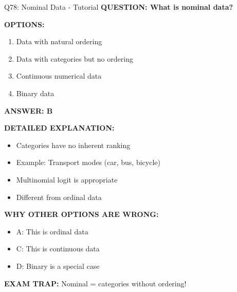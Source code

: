 \documentclass[8pt]{beamer}
\begin{document}
	\begin{frame}{Q78: Nominal Data - Tutorial}
		\fontsize{6.5}{7.5}\selectfont
		\textbf{QUESTION: What is nominal data?}
		
		\vspace{0.1cm}
		\textbf{OPTIONS:}
		\begin{enumerate}
			\item Data with natural ordering
			\item Data with categories but no ordering
			\item Continuous numerical data
			\item Binary data
		\end{enumerate}
		
		\vspace{0.1cm}
		\textcolor{myblue}{\textbf{ANSWER: B}}
		
		\vspace{0.1cm}
		\textbf{DETAILED EXPLANATION:}
		\begin{itemize}
			\item Categories have no inherent ranking
			\item Example: Transport modes (car, bus, bicycle)
			\item Multinomial logit is appropriate
			\item Different from ordinal data
		\end{itemize}
		
		\vspace{0.1cm}
		\textcolor{myred}{\textbf{WHY OTHER OPTIONS ARE WRONG:}}
		\begin{itemize}
			\item \textcolor{myred}{A:} This is ordinal data
			\item \textcolor{myred}{C:} This is continuous data
			\item \textcolor{myred}{D:} Binary is a special case
		\end{itemize}
		
		\textcolor{myred}{\textbf{EXAM TRAP:}} Nominal = \textcolor{myblue}{categories without ordering}!
	\end{frame}
	
\end{document}

